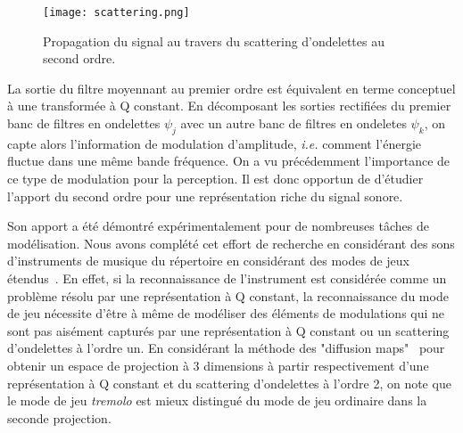 \begin{figure}
  \texttt{[image: scattering.png]}
  \caption{Propagation du signal au travers du scattering d'ondelettes au second ordre.}
  \label{fig:scat}
\end{figure}


La sortie du filtre moyennant au premier ordre est équivalent en terme conceptuel à une transformée à Q constant. En décomposant les sorties rectifiées du premier banc de filtres en ondelettes $\psi_j$ avec un autre banc de filtres en ondeletes $\psi_k$, on capte alors l'information de modulation d'amplitude, \textit{i.e.} comment l'énergie fluctue dans une même bande fréquence. On a vu précédemment l'importance de ce type de modulation pour la perception. Il est donc opportun de d'étudier l'apport du second ordre pour une représentation riche du signal sonore.  %


Son apport a été démontré expérimentalement pour de nombreuses tâches de modélisation. Nous avons complété cet effort de recherche en considérant des sons d'instruments de musique du répertoire en considérant des modes de jeux étendus~\cite{lostanlen2018extended}. En effet, si la reconnaissance de l'instrument est considérée comme un problème résolu par une représentation à Q constant, la reconnaissance du mode de jeu nécessite d'être à même de modéliser des éléments de modulations qui ne sont pas aisément capturés par une représentation à Q constant ou un scattering d'ondelettes à l'ordre un. En considérant la méthode des "diffusion maps"~\cite{coifman2005geometric} pour obtenir un espace de projection à 3 dimensions à partir respectivement d'une représentation à Q constant et du scattering d'ondelettes à l'ordre 2, on note que le mode de jeu \textsl{tremolo} est mieux distingué du mode de jeu ordinaire dans la seconde projection.

